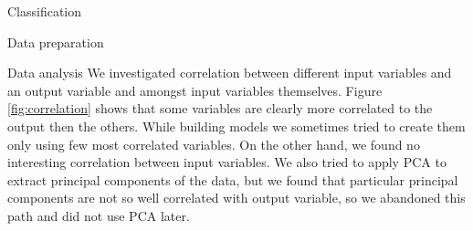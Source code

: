 \documentclass{article}
\begin{document}
\begin{section}{Classification}
\begin{subsection}{Data preparation}
\begin{figure}[!h]
\center
{}
\hfill
{}
\caption{}
\end{figure}

\end{subsection}
\begin{subsection}{Data analysis}
We investigated correlation between different input variables and an output variable and amongst input variables themselves. Figure \ref{fig:correlation} shows that some variables are clearly more correlated to the output then the others. While building models we sometimes tried to create them only using few most correlated variables. On the other hand, we found no interesting correlation between input variables. We also tried to apply PCA to extract principal components of the data, but we found that particular principal components are not so well correlated with output variable, so we abandoned this path and did not use PCA later.


\end{subsection}
\end{section}
\end{document}
